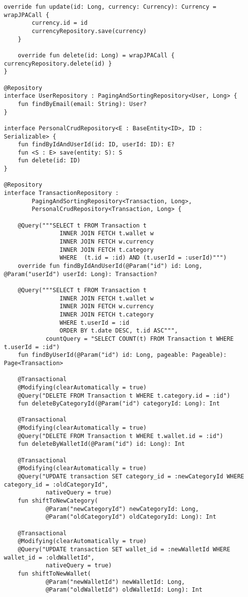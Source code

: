 \begin{lstlisting}[style = ktstyle]
    override fun update(id: Long, currency: Currency): Currency = wrapJPACall {
        currency.id = id
        currencyRepository.save(currency)
    }

    override fun delete(id: Long) = wrapJPACall { currencyRepository.delete(id) }
}

@Repository
interface UserRepository : PagingAndSortingRepository<User, Long> {
    fun findByEmail(email: String): User?
}

interface PersonalCrudRepository<E : BaseEntity<ID>, ID : Serializable> {
    fun findByIdAndUserId(id: ID, userId: ID): E?
    fun <S : E> save(entity: S): S
    fun delete(id: ID)
}

@Repository
interface TransactionRepository :
        PagingAndSortingRepository<Transaction, Long>,
        PersonalCrudRepository<Transaction, Long> {

    @Query("""SELECT t FROM Transaction t
                INNER JOIN FETCH t.wallet w
                INNER JOIN FETCH w.currency
                INNER JOIN FETCH t.category
                WHERE  (t.id = :id) AND (t.userId = :userId)""")
    override fun findByIdAndUserId(@Param("id") id: Long, @Param("userId") userId: Long): Transaction?

    @Query("""SELECT t FROM Transaction t
                INNER JOIN FETCH t.wallet w
                INNER JOIN FETCH w.currency
                INNER JOIN FETCH t.category
                WHERE t.userId = :id
                ORDER BY t.date DESC, t.id ASC""",
            countQuery = "SELECT COUNT(t) FROM Transaction t WHERE t.userId = :id")
    fun findByUserId(@Param("id") id: Long, pageable: Pageable): Page<Transaction>

    @Transactional
    @Modifying(clearAutomatically = true)
    @Query("DELETE FROM Transaction t WHERE t.category.id = :id")
    fun deleteByCategoryId(@Param("id") categoryId: Long): Int

    @Transactional
    @Modifying(clearAutomatically = true)
    @Query("DELETE FROM Transaction t WHERE t.wallet.id = :id")
    fun deleteByWalletId(@Param("id") id: Long): Int

    @Transactional
    @Modifying(clearAutomatically = true)
    @Query("UPDATE transaction SET category_id = :newCategoryId WHERE category_id = :oldCategoryId",
            nativeQuery = true)
    fun shiftToNewCategory(
            @Param("newCategoryId") newCategoryId: Long,
            @Param("oldCategoryId") oldCategoryId: Long): Int

    @Transactional
    @Modifying(clearAutomatically = true)
    @Query("UPDATE transaction SET wallet_id = :newWalletId WHERE wallet_id = :oldWalletId",
            nativeQuery = true)
    fun shiftToNewWallet(
            @Param("newWalletId") newWalletId: Long,
            @Param("oldWalletId") oldWalletId: Long): Int


\end{lstlisting}
